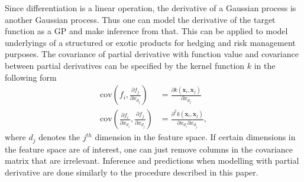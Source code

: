 \documentclass[11pt,a4paper]{article}
\theoremstyle{definition}
\numberwithin{equation}{section}
\let\vec\mathbf
\begin{document}
		Since differentiation is a linear operation, the derivative of a Gaussian process is another Gaussian process. Thus one can model the derivative of the target function as a GP and make inference from that. This can be applied to model underlyings of a structured or exotic products for hedging and risk management purposes. The covariance of partial derivative with function value and covariance between partial derivatives can be specified by the kernel function $k$ in the following form
		\begin{equation}
		\begin{split}
		\text{cov}\left(f_i,\frac{\partial f_j}{\partial x_{d_j}}\right)&=\frac{\partial k(\vec x_i,\vec x_j)}{\partial x_{d_j}}\\
		\text{cov}\left(\frac{\partial f_i}{\partial x_{d_i}},\frac{\partial f_j}{\partial x_{d_j}}\right)&=\frac{\partial^2 k(\vec x_i,\vec x_j)}{\partial x_{d_i}\partial x_{d_j}},
		\end{split}
		\end{equation}
		where $d_j$ denotes the $j^{th}$ dimension in the feature space. If certain dimensions in the feature space are of interest, one can just remove columns in the covariance matrix that are irrelevant. Inference and predictions when modelling with partial derivative are done similarly to the procedure described in this paper.
		
		
		
		
		
		
\end{document}
